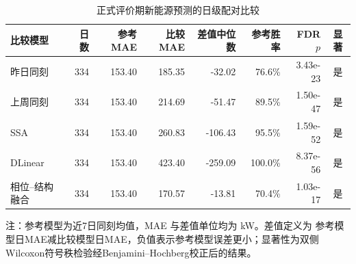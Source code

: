 \begin{table}[H]
  \centering
  \caption{正式评价期新能源预测的日级配对比较}
  \label{tab:q2-forecast-significance}
  \scriptsize
  \setlength{\tabcolsep}{3.2pt}
  \begin{tabular}{lrrrrrrc}
    \toprule
    比较模型 & 日数 & 参考MAE & 比较MAE & 差值中位数 & 参考胜率 & FDR $p$ & 显著 \\
    \midrule
    昨日同刻 & 334 & 153.40 & 185.35 & -32.02 & 76.6\% & 3.43e-23 & 是 \\
    上周同刻 & 334 & 153.40 & 214.69 & -51.47 & 89.5\% & 1.50e-47 & 是 \\
    SSA & 334 & 153.40 & 260.83 & -106.43 & 95.5\% & 1.59e-52 & 是 \\
    DLinear & 334 & 153.40 & 423.40 & -259.09 & 100.0\% & 8.37e-56 & 是 \\
    相位--结构融合 & 334 & 153.40 & 170.57 & -13.81 & 70.4\% & 1.03e-17 & 是 \\
    \bottomrule
  \end{tabular}
  \vspace{2pt}
  \begin{minipage}{0.97\textwidth}
    \footnotesize 注：参考模型为近7日同刻均值，MAE 与差值单位均为 kW。差值定义为
    参考模型日MAE减比较模型日MAE，负值表示参考模型误差更小；显著性为双侧
    Wilcoxon符号秩检验经Benjamini--Hochberg校正后的结果。
  \end{minipage}
\end{table}

